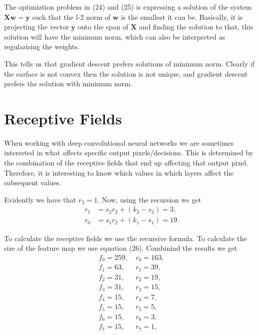 \documentclass[twoside]{article}
\begin{document}
The optimiztion problem in (24) and (25) is expressing a solution of
the system $\bm{Xw} = \bm{y}$ such that the l-2 norm of $\bm{w}$ is the
smallest it can be. Basically, it is projecting the vector $\bm{y}$ onto 
the span of $\bm{X}$ and finding the solution to that, this 
solution will have the minimum norm, which can also be interpreted as 
regularising the weights.

This tells us that gradient descent prefers solutions of minimum norm.
Clearly if the surface is not convex then the solution is not unique,
and gradient descent prefers the solution with minimum norm.

\newpage
\section{Receptive Fields}
When working with deep convolutional neural networks we are sometimes 
interested in what affects specific output pixels/decisions. This is determined 
by the combination of the receptive fields that end up affecting that output pixel.
Therefore, it is interesting to know which values in which layers affect the 
subsequent values.

Evidently we have that $r_{2} = 1$.
Now, using the recursion we get 
\begin{align*}
    r_{1} &= s_{2}r_{2} + (k_{2} - s_{2}) = 3,\\ 
    r_{0} &= s_{1}r_{2} + (k_{1} - s_{1}) = 19.
\end{align*}

To calculate the receptive fields we use the recursive formula.
To calculate the size of the feature map we use equation (26).
Combinind the results we get
\begin{align*}
    f_{0} = 259,\ & r_{0} = 163,\\
    f_{1} = 63,\ & r_{1} = 39,\\
    f_{2} = 31,\ & r_{2} = 19,\\
    f_{3} = 31,\ & r_{3} = 15,\\
    f_{4} = 15,\ & r_{4} = 7,\\
    f_{5} = 15,\ & r_{5} = 5,\\
    f_{6} = 15,\ & r_{6} = 3,\\
    f_{7} = 15,\  & r_{7} = 1,\\
\end{align*}
\end{document}
